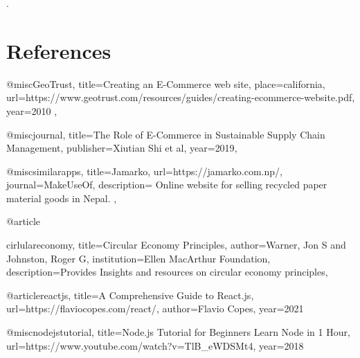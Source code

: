 \documentclass[12pt, a4paper, oneside]{article}
\begin{document}


. \pagebreak
\section{References}


@misc{GeoTrust,
title={Creating an E-Commerce web site},
place={california},
url={https://www.geotrust.com/resources/guides/creating-ecommerce-website.pdf},
year={2010}
},

@misc{journal,
title={The Role of E-Commerce in Sustainable Supply Chain Management},
publisher={Xiutian Shi et al},
year={2019},
}

@misc{similarapps,
title={Jamarko},
url={https://jamarko.com.np/},
journal={MakeUseOf},
description={
Online website for selling recycled paper material goods in Nepal.
},
}

@article{cirlulareconomy,
  title={Circular Economy Principles},
  author={Warner, Jon S and Johnston, Roger G},
  institution={Ellen MacArthur Foundation},
  description={Provides Insights and resources on circular economy principles},

}

@article{reactjs,
title={A Comprehensive Guide to React.js},
url={https://flaviocopes.com/react/},
author={Flavio Copes},
year={2021}
}


@misc{nodejstutorial,
title={Node.js Tutorial for Beginners  Learn Node in 1 Hour},
url={https://www.youtube.com/watch?v=TlB\_eWDSMt4},
year={2018}
}
\end{document}
